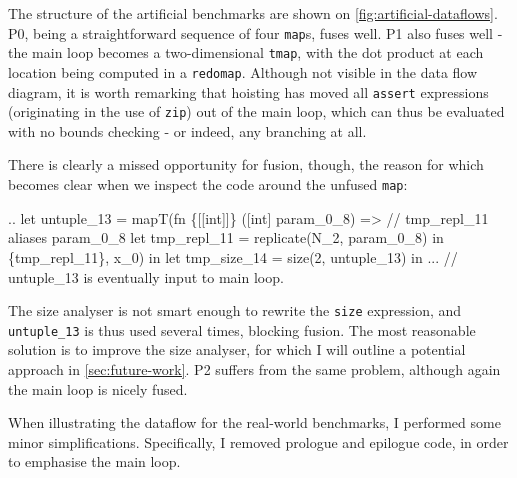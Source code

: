 The structure of the artificial benchmarks are shown on
\cref{fig:artificial-dataflows}.  P0, being a straightforward sequence
of four \texttt{map}s, fuses well.  P1 also fuses well - the main loop
becomes a two-dimensional \texttt{tmap}, with the dot product at each
location being computed in a \texttt{redomap}.  Although not visible
in the data flow diagram, it is worth remarking that hoisting has
moved all \texttt{assert} expressions (originating in the use of
\texttt{zip}) out of the main loop, which can thus be evaluated with
no bounds checking - or indeed, any branching at all.

There is clearly a missed opportunity for fusion, though, the reason
for which becomes clear when we inspect the code around the unfused
\texttt{map}:
\begin{colorcode}
..
let {untuple_13} =
  mapT(fn \{[[int]]\} ([int] param_0_8) =>
         // tmp_repl_11 aliases param_0_8
         let tmp_repl_11 = replicate(N_2, param_0_8) in
         \{tmp_repl_11\},
       x_0) in
let tmp_size_14 = size(2, untuple_13) in
... // untuple_13 is eventually input to main loop.
\end{colorcode}
The size analyser is not smart enough to rewrite the \texttt{size}
expression, and \texttt{untuple\_13} is thus used several times,
blocking fusion.  The most reasonable solution is to improve the size
analyser, for which I will outline a potential approach in
\cref{sec:future-work}.  P2 suffers from the same problem, although
again the main loop is nicely fused.

When illustrating the dataflow for the real-world benchmarks, I
performed some minor simplifications.  Specifically, I removed
prologue and epilogue code, in order to emphasise the main loop.

